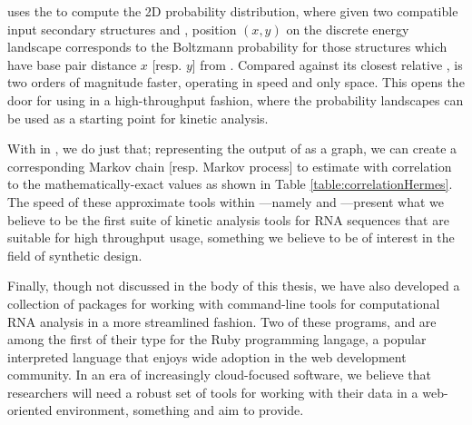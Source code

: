  uses the \fft to compute the 2D probability distribution, where
given two compatible input secondary structures \strA and \strB, position
$(x,y)$ on the discrete energy landscape corresponds to the Boltzmann
probability for those structures \str which have base pair distance $x$ [resp. $y$]
from . Compared against its closest relative \rnatwofold,
\ffttwo is two orders of magnitude faster, operating in  speed and only
 space. This opens the door for using \ffttwo in a high-throughput fashion,
where the probability landscapes can be used as a starting point for kinetic
analysis.

With \hermes in , we do just that; representing the output of
\ffttwo as a graph, we can create a corresponding Markov chain [resp. Markov
process] to estimate  with correlation to the
mathematically-exact values as shown in Table \ref{table:correlationHermes}.
The speed of these approximate tools within \hermes---namely \fftmfpt and
\ffteq---present what we believe to be the first suite of kinetic analysis
tools for RNA sequences that are suitable for high throughput usage, something
we believe to be of interest in the field of synthetic design.

Finally, though not discussed in the body of this thesis, we have also
developed a collection of packages for working with command-line tools for
computational RNA analysis in a more streamlined fashion. Two of these programs,
\href{https://github.com/evansenter/wrnap}{\wrnap} and
\href{https://github.com/evansenter/rbfam}{\rbfam} are among the first of their
type for the Ruby programming langage, a popular interpreted language that
enjoys wide adoption in the web development community. In an era of increasingly
cloud-focused software, we believe that researchers will need a robust set of
tools for working with their data in a web-oriented environment, something
\wrnap and \rbfam aim to provide.
